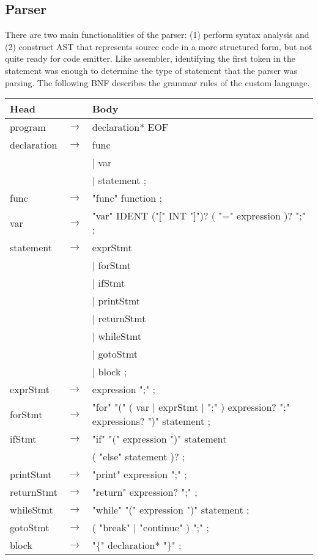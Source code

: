 \documentclass[manuscript,screen,nonacm]{acmart}
\begin{document}
\subsection{Parser}
There are two main functionalities of the parser: (1) perform syntax analysis and (2) construct AST that represents source code in a more structured form, but not quite ready for code emitter. Like assembler, identifying the first token in the statement was enough to determine the type of statement that the parser was parsing. The following BNF describes the grammar rules of the custom language. 

\begin{center}
\begin{tabular}{l l l}
    \hline
    Head & & Body \\
    \hline
    program & $\rightarrow$ & declaration* EOF \\
    declaration & $\rightarrow$ & func \\
    ~ & ~ & | var \\
    ~ & ~ & | statement ; \\
    func & $\rightarrow$ & "func" function ; \\
    var & $\rightarrow$ & "var" IDENT ("[" INT "]")? ( "=" expression )? ";" ; \\
    statement & $\rightarrow$ & exprStmt \\
    ~ & ~ & | forStmt \\
    ~ & ~ & | ifStmt \\
    ~ & ~ & | printStmt \\
    ~ & ~ & | returnStmt \\
    ~ & ~ & | whileStmt \\
    ~ & ~ & | gotoStmt \\
    ~ & ~ & | block ; \\
    exprStmt & $\rightarrow$ & expression ";" ; \\
    forStmt & $\rightarrow$ & "for" "(" ( var | exprStmt | ";" ) expression? ";" expressions? ")" statement ; \\
    ifStmt & $\rightarrow$ & "if" "(" expression ")" statement \\
    ~ & ~ & ( "else" statement )? ; \\
    printStmt & $\rightarrow$ & "print" expression ";" ; \\
    returnStmt & $\rightarrow$ & "return" expression? ";" ; \\
    whileStmt & $\rightarrow$ & "while" "(" expression ")" statement ; \\
    gotoStmt & $\rightarrow$ & ( "break" | "continue" ) ";" ; \\
    block & $\rightarrow$ & "$\{$" declaration* "$\}$" ; \\
    \hline
\end{tabular}
\end{center}
\end{document}
